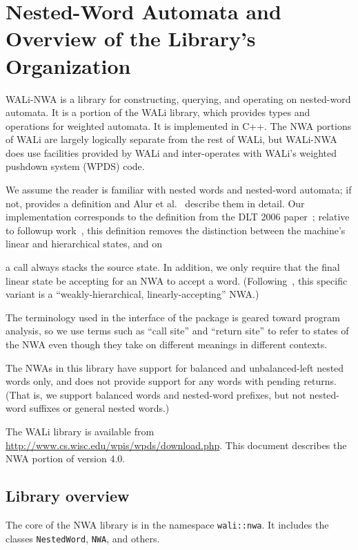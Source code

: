 \section{Nested-Word Automata and Overview of the Library's Organization}
\label{Se:Nested Word Automata}

WALi-NWA is a library for constructing, querying, and operating on
nested-word automata.  It is a portion of the WALi library, which provides
types and operations for weighted automata.
It is implemented in C++.  The NWA portions of WALi
are largely logically separate from the rest of WALi, but WALi-NWA does use
facilities provided by WALi and inter-operates with WALi's weighted pushdown
system (WPDS) code.

We assume the reader is familiar with nested words and
nested-word automata; if not,  provides a definition and
Alur et al.~\cite{DLT:AM2006,JACM:AM2009} describe them in detail. Our
implementation corresponds to the definition from the DLT 2006
paper~\cite{DLT:AM2006}; relative to followup work~\cite{JACM:AM2009}, this definition removes
the distinction between the machine's linear and hierarchical states, and on

a call always stacks the source state. In addition, we only require that the
final linear state be accepting for an NWA to accept a
word. (Following~\cite{JACM:AM2009}, this specific variant is a
``weakly-hierarchical, linearly-accepting'' NWA.)


The terminology used in the interface of the package is geared
toward program analysis, so we use terms such as ``call site'' and ``return
site'' to refer to states of the NWA even though they take on different
meanings in different contexts.

The NWAs in this library have support for balanced and unbalanced-left nested
words only, and does not provide support for any words with pending
returns. (That is, we support balanced words and nested-word prefixes, but
not nested-word suffixes or general nested words.)

The WALi library is available from
\url{http://www.cs.wisc.edu/wpis/wpds/download.php}. This document describes
the NWA portion of version 4.0.


\subsection{Library overview}

The core of the NWA library is in the namespace \texttt{wali::nwa}. It
includes the classes \texttt{NestedWord}, \texttt{NWA}, and others.

